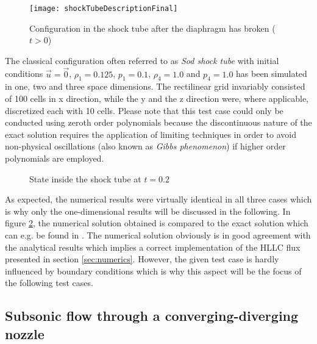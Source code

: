 \begin{figure}
	\centering
	\texttt{[image: shockTubeDescriptionFinal]}
	\caption{Configuration in the shock tube after the diaphragm has broken
	($t>0$)}
	\label{fig:shock_tube_final}
\end{figure}

The classical configuration often referred to as \emph{Sod shock tube} with
initial conditions $\vec{u} = \vec{0}$, $\rho_1 = 0.125$, $p_1 = 0.1$,
$\rho_4 = 1.0$ and $p_4 = 1.0$ has been simulated in one, two and three space
dimensions. The rectilinear grid invariably consisted of 100 cells in x
direction, while the y and the z direction were, where applicable, discretized
each with 10 cells. Please note that this test case could only be conducted
using zeroth order polynomials because the discontinuous nature of the exact
solution requires the application of limiting techniques in order to avoid
non-physical oscillations (also known as \emph{Gibbs phenomenon}) if higher
order polynomials are employed.

\begin{figure}
	\centering
	\quad
	\caption{State inside the shock tube at $t=0.2$}
	\label{fig:shockTubeResults}
\end{figure}

As expected, the numerical results were virtually identical in all three cases
which is why only the one-dimensional results will be discussed in the
following. In figure \ref{fig:shockTubeResults}, the numerical solution obtained
is compared to the exact solution which can e.g. be found in
\cite{Anderson2002}. The numerical solution obviously is in good agreement
with the analytical results which implies a correct implementation of the HLLC
flux presented in section \ref{sec:numerics}. However, the given test case is
hardly influenced by boundary conditions which is why this aspect will be the
focus of the following test cases.


\subsection{Subsonic flow through a converging-diverging nozzle}

